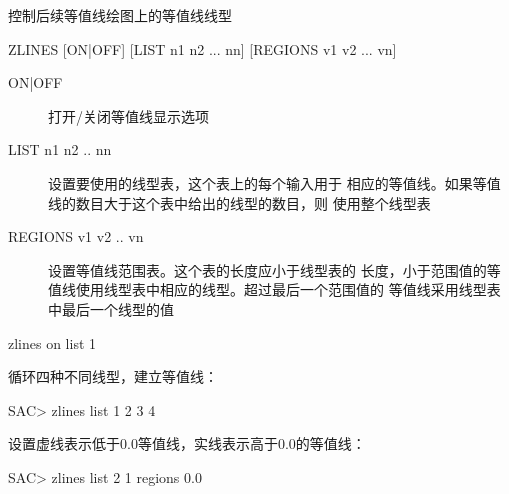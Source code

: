 \label{cmd:zlines}

控制后续等值线绘图上的等值线线型

\begin{SACSTX}
ZLINES  [ON|OFF] [LIST n1 n2 ... nn] [REGIONS v1 v2 ... vn]
\end{SACSTX}

\begin{description}
\item [ON|OFF] 打开/关闭等值线显示选项
\item [LIST n1 n2 .. nn] 设置要使用的线型表，这个表上的每个输入用于
    相应的等值线。如果等值线的数目大于这个表中给出的线型的数目，则
    使用整个线型表
\item [REGIONS v1 v2 .. vn] 设置等值线范围表。这个表的长度应小于线型表的
    长度，小于范围值的等值线使用线型表中相应的线型。超过最后一个范围值的
    等值线采用线型表中最后一个线型的值
\end{description}

\begin{SACDFT}
zlines on list 1
\end{SACDFT}

循环四种不同线型，建立等值线：
\begin{SACCode}
SAC> zlines list 1 2 3 4
\end{SACCode}

设置虚线表示低于0.0等值线，实线表示高于0.0的等值线：
\begin{SACCode}
SAC> zlines list 2 1 regions 0.0
\end{SACCode}
